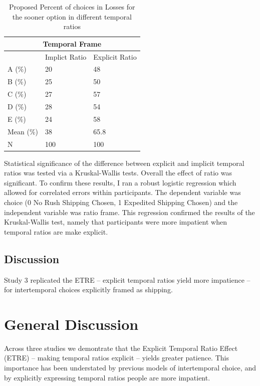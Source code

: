 \documentclass[]{article}
\begin{document}
\begin{table}[!ht]
	\caption{Proposed Percent of choices in Losses for the sooner option in different temporal ratios} 
	\label{tab:study3results}
	\begin{tabular}{ p{3cm}||p{3cm}|p{3cm}  }
		\multicolumn{3}{|c|}{Temporal Frame} \\
		\hline
		& Implict Ratio & Explicit Ratio\\
		\hline
		A (\%)	 & 20  & 48\\
		B (\%) 	 & 25  & 50\\
		C (\%) 	 & 27  & 57\\
		D (\%)   & 28  & 54\\
		E (\%)   & 24  & 58\\
		Mean (\%) & 38  & 65.8 \\
		N  	 & 100  & 100\\
		\hline	
	\end{tabular}
\end{table}

Statistical significance of  the difference between explicit and implicit temporal ratios was tested via a Kruskal-Wallis tests.
Overall the effect of ratio was significant. 
To confirm these results, I ran a robust logistic regression which allowed for correlated errors within participants.
The dependent variable was choice (0 No Rush Shipping Chosen, 1 Expedited Shipping Chosen) and the independent variable was ratio frame. 
This regression confirmed the results of the Kruskal-Wallis test, namely that participants were more impatient when temporal ratios are make explicit. 

\subsection{Discussion}

Study 3 replicated the ETRE -- explicit temporal ratios yield more impatience -- for intertemporal choices explicitly framed as shipping. 


\section{General Discussion}

Across three studies we demontrate that the Explicit Temporal Ratio Effect (ETRE) -- making temporal ratios explicit -- yields greater patience. 
This importance has been understated by previous models of intertemporal choice, and by explicitly expressing temporal ratios people are more impatient. 
\end{document}
